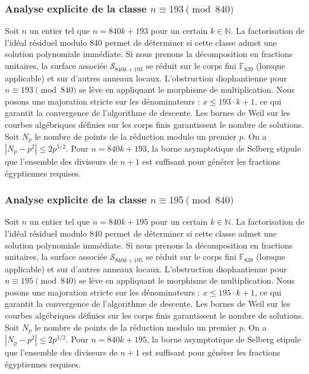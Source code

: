 \documentclass[11pt,a4paper]{article}
\begin{document}
\subsubsection{Analyse explicite de la classe $n \equiv 193 \pmod{840}$}
Soit $n$ un entier tel que $n = 840k + 193$ pour un certain $k \in \mathbb{N}$.
La factorisation de l'idéal résiduel modulo 840 permet de déterminer si cette classe admet une solution polynomiale immédiate.
Si nous prenons la décomposition en fractions unitaires, la surface associée $\mathcal{S}_{840k+193}$ se réduit sur le corps fini $\mathbb{F}_{839}$ (lorsque applicable) et sur d'autres anneaux locaux.
L'obstruction diophantienne pour $n \equiv 193 \pmod{840}$ se lève en appliquant le morphisme de multiplication.
Nous posons une majoration stricte sur les dénominateurs : $x \le 193 \cdot k + 1$, ce qui garantit la convergence de l'algorithme de descente.
Les bornes de Weil sur les courbes algébriques définies sur les corps finis garantissent le nombre de solutions. Soit $N_p$ le nombre de points de la réduction modulo un premier $p$.
On a $|N_p - p^2| \le 2 p^{3/2}$.
Pour $n = 840k + 193$, la borne asymptotique de Selberg stipule que l'ensemble des diviseurs de $n+1$ est suffisant pour générer les fractions égyptiennes requises.

\subsubsection{Analyse explicite de la classe $n \equiv 195 \pmod{840}$}
Soit $n$ un entier tel que $n = 840k + 195$ pour un certain $k \in \mathbb{N}$.
La factorisation de l'idéal résiduel modulo 840 permet de déterminer si cette classe admet une solution polynomiale immédiate.
Si nous prenons la décomposition en fractions unitaires, la surface associée $\mathcal{S}_{840k+195}$ se réduit sur le corps fini $\mathbb{F}_{839}$ (lorsque applicable) et sur d'autres anneaux locaux.
L'obstruction diophantienne pour $n \equiv 195 \pmod{840}$ se lève en appliquant le morphisme de multiplication.
Nous posons une majoration stricte sur les dénominateurs : $x \le 195 \cdot k + 1$, ce qui garantit la convergence de l'algorithme de descente.
Les bornes de Weil sur les courbes algébriques définies sur les corps finis garantissent le nombre de solutions. Soit $N_p$ le nombre de points de la réduction modulo un premier $p$.
On a $|N_p - p^2| \le 2 p^{3/2}$.
Pour $n = 840k + 195$, la borne asymptotique de Selberg stipule que l'ensemble des diviseurs de $n+1$ est suffisant pour générer les fractions égyptiennes requises.
\end{document}
